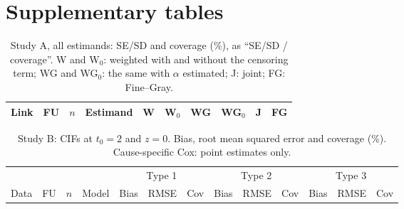 \documentclass[11pt]{article}
\begin{document}
\section{Supplementary tables}\label{app:tables}
\begin{table}[h]
\centering\tiny
\caption{Study A, all estimands: SE/SD and coverage (\%), as ``SE/SD / coverage''. W and W$_0$:
weighted with and without the censoring term; WG and WG$_0$: the same with $\alpha$ estimated; J: joint;
FG: Fine--Gray.}
\label{tab:Afull}
\setlength{\tabcolsep}{2pt}
\begin{tabular}{llll cccccc}
\toprule
Link & FU & $n$ & Estimand & W & W$_0$ & WG & WG$_0$ & J & FG \\
\midrule

\end{tabular}
\end{table}

\begin{table}[h]
\centering\scriptsize
\caption{Study B: CIFs at $t_0 = 2$ and $z = 0$. Bias, root mean squared error and coverage (\%).
Cause-specific Cox: point estimates only.}
\label{tab:Bt0}
\setlength{\tabcolsep}{3pt}
\begin{tabular}{llll rrr rrr rrr}
\toprule
 & & & & \multicolumn{3}{c}{Type 1} & \multicolumn{3}{c}{Type 2} & \multicolumn{3}{c}{Type 3}\\
\cmidrule(lr){5-7}\cmidrule(lr){8-10}\cmidrule(lr){11-13}
Data & FU & $n$ & Model & Bias & RMSE & Cov & Bias & RMSE & Cov & Bias & RMSE & Cov \\
\midrule

\end{tabular}
\end{table}
\end{document}
